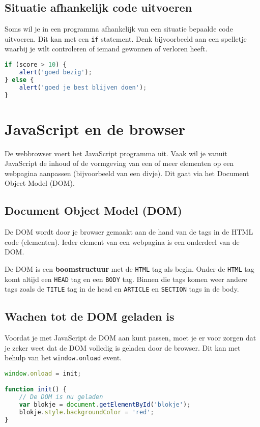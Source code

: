 \documentclass[8pt,pagesize,footinclude=false,headinclude=false]{scrartcl}
\begin{document}
\begin{multicols*}{3}
\subsection*{Situatie afhankelijk code uitvoeren}
Soms wil je in een programma afhankelijk van een situatie bepaalde code uitvoeren. Dit kan met een \texttt{if} statement. Denk bijvoorbeeld aan een spelletje waarbij je wilt controleren of iemand gewonnen of verloren heeft.
\begin{lstlisting}[language=javascript]
if (score > 10) {
	alert('goed bezig');
} else {
	alert('goed je best blijven doen');
}
\end{lstlisting}

\section*{JavaScript en de browser}
De webbrowser voert het JavaScript programma uit. Vaak wil je vanuit JavaScript de inhoud of de vormgeving van een of meer elementen op een webpagina aanpassen (bijvoorbeeld van een divje). Dit gaat via het Document Object Model (DOM).

\subsection*{Document Object Model (DOM)}
De DOM wordt door je browser gemaakt aan de hand van de tags in de HTML code (elementen). Ieder element van een webpagina is een onderdeel van de DOM. 

De DOM is een \textbf{boomstructuur} met de \texttt{HTML} tag als begin. Onder de \texttt{HTML} tag komt altijd een \texttt{HEAD} tag en een \texttt{BODY} tag. Binnen die tags komen weer andere tags zoals de \texttt{TITLE} tag in de head en \texttt{ARTICLE} en \texttt{SECTION} tags in de body. 

\subsection*{Wachen tot de DOM geladen is}
Voordat je met JavaScript de DOM aan kunt passen, moet je er voor zorgen dat je zeker weet dat de DOM volledig is geladen door de browser. Dit kan met behulp van het \texttt{window.onload} event.
\begin{lstlisting}[language=javascript]
window.onload = init;

function init() {
	// De DOM is nu geladen
	var blokje = document.getElementById('blokje');
	blokje.style.backgroundColor = 'red';
}
\end{lstlisting}


\end{multicols*}
\end{document}
